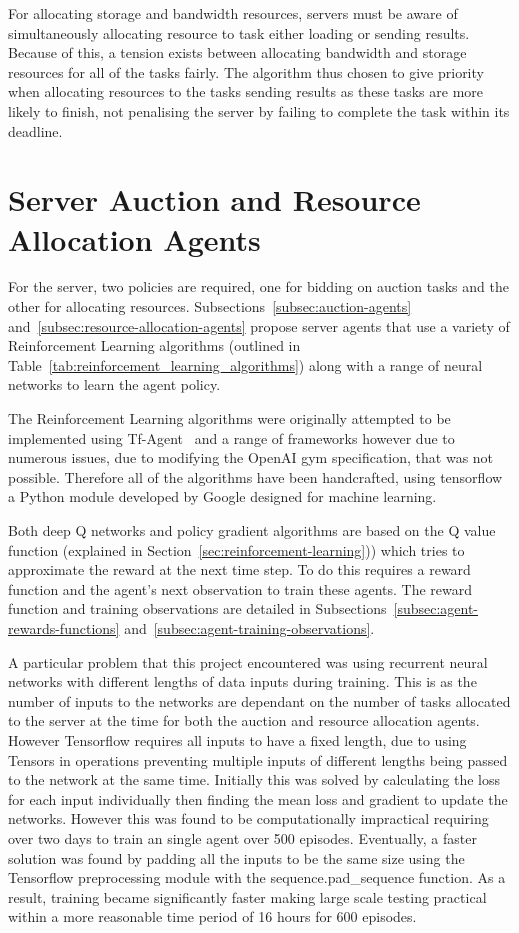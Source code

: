 For allocating storage and bandwidth resources, servers must be aware of simultaneously allocating resource to task
either loading or sending results. Because of this, a tension exists between allocating bandwidth and
storage resources for all of the tasks fairly. The algorithm thus chosen to give priority when allocating
resources to the tasks sending results as these tasks are more likely to finish, not penalising the server by failing
to complete the task within its deadline.

\section{Server Auction and Resource Allocation Agents}
\label{sec:server-auction-and-resource-allocation-agents}
For the server, two policies are required, one for bidding on auction tasks and the other for allocating resources.
Subsections~\ref{subsec:auction-agents} and~\ref{subsec:resource-allocation-agents} propose server agents that use
a variety of Reinforcement Learning algorithms (outlined in Table~\ref{tab:reinforcement_learning_algorithms}) along
with a range of neural networks to learn the agent policy.

The Reinforcement Learning algorithms were originally attempted to be implemented using Tf-Agent~\citep{tf-agent} and a
range of frameworks however due to numerous issues, due to modifying the OpenAI gym specification, that was not
possible. Therefore all of the algorithms have been handcrafted, using tensorflow~\citep{tensorflow2015-whitepaper} a
Python module developed by Google designed for machine learning.

Both deep Q networks and policy gradient algorithms are based on the Q value function (explained in
Section~\ref{sec:reinforcement-learning})) which tries to approximate the reward at the next time step. To do
this requires a reward function and the agent's next observation to train these agents. The reward function and training
observations are detailed in Subsections~\ref{subsec:agent-rewards-functions} and~\ref{subsec:agent-training-observations}.

A particular problem that this project encountered was using recurrent neural networks with different lengths of data
inputs during training. This is as the number of inputs to the networks are dependant on the number of tasks allocated
to the server at the time for both the auction and resource allocation agents. However Tensorflow requires all inputs to
have a fixed length, due to using Tensors in operations preventing multiple inputs of different lengths being passed to
the network at the same time.  Initially this was solved by calculating the loss for each input individually
then finding the mean loss and gradient to update the networks. However this was found to be computationally impractical
requiring over two days to train an single agent over 500 episodes. Eventually, a faster solution was found by padding
all the inputs to be the same size using the Tensorflow preprocessing module with the sequence.pad\_sequence function.
As a result, training became significantly faster making large scale testing practical within a more reasonable time
period of 16 hours for 600 episodes.

